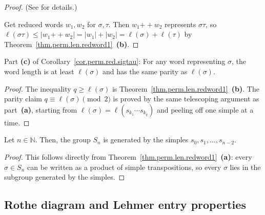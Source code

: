 \begin{proof}
\leanok
(See \cite[Exercise 5.2 \textbf{(c)}]{detnotes} for details.)

Get reduced words $w_1, w_2$ for $\sigma, \tau$. Then $w_1 \mathbin{+\!+} w_2$
represents $\sigma\tau$, so
$\ell(\sigma\tau) \leq |w_1 \mathbin{+\!+} w_2| = |w_1| + |w_2| = \ell(\sigma) + \ell(\tau)$
by Theorem~\ref{thm.perm.len.redword1}~\textbf{(b)}.
\end{proof}

\begin{theorem}
\label{cor.perm.red.sigtau.c}
\leanhelper
\leanok
Part \textbf{(c)} of Corollary~\ref{cor.perm.red.sigtau}: For any word representing $\sigma$,
the word length is at least $\ell(\sigma)$ and has the same parity as $\ell(\sigma)$.
\end{theorem}

\begin{proof}
\leanok
The inequality $q \geq \ell(\sigma)$ is
Theorem~\ref{thm.perm.len.redword1}~\textbf{(b)}.
The parity claim $q \equiv \ell(\sigma) \pmod{2}$ is proved by
the same telescoping argument as part~\textbf{(a)}, starting from
$\ell(\sigma) = \ell(s_{k_1} \cdots s_{k_q})$ and peeling off one
simple at a time.
\end{proof}


\begin{corollary}
\label{cor.perm.generated}
\leantarget
\leanok
Let $n \in \mathbb{N}$. Then, the group $S_n$ is generated by the simples
$s_0, s_1, \ldots, s_{n-2}$.
\end{corollary}

\begin{proof}
\leanok
This follows directly from Theorem~\ref{thm.perm.len.redword1}~\textbf{(a)}:
every $\sigma \in S_n$ can be written as a product of simple transpositions,
so every $\sigma$ lies in the subgroup generated by the simples.
\end{proof}


\subsection{Rothe diagram and Lehmer entry properties}

